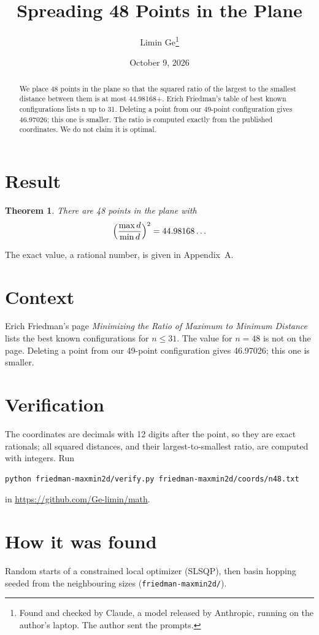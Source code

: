 \documentclass[11pt,a4paper]{article}
\title{Spreading 48 Points in the Plane}
\author{Limin Ge\thanks{Found and checked by Claude, a model released by Anthropic, running on the author's laptop. The author sent the prompts.}}
\date{October 9, 2026}
\newtheorem*{theorem}{Theorem}
\begin{document}
\maketitle
\begin{abstract}
We place 48 points in the plane so that the squared ratio of the largest to the smallest distance between them is at most 44.98168+. Erich Friedman's table of best known configurations lists n up to 31. Deleting a point from our 49-point configuration gives 46.97026; this one is smaller. The ratio is computed exactly from the published coordinates. We do not claim it is optimal.
\end{abstract}

\section{Result}
\begin{theorem}
There are 48 points in the plane with
\[ \Bigl(\frac{\max d}{\min d}\Bigr)^2 = 44.98168\ldots \]
\end{theorem}
The exact value, a rational number, is given in Appendix~A.


\section{Context}
Erich Friedman's page \emph{Minimizing the Ratio of Maximum to Minimum Distance} lists the best known configurations for $n\le 31$. The value for $n=48$ is not on the page. Deleting a point from our 49-point configuration gives 46.97026; this one is smaller.


\section{Verification}
The coordinates are decimals with 12 digits after the point, so they are exact rationals; all squared distances, and their largest-to-smallest ratio, are computed with integers. Run
\begin{verbatim}
python friedman-maxmin2d/verify.py friedman-maxmin2d/coords/n48.txt
\end{verbatim}
in \url{https://github.com/Ge-limin/math}.


\section{How it was found}
Random starts of a constrained local optimizer (SLSQP), then basin hopping seeded from the neighbouring sizes (\texttt{friedman-maxmin2d/}).
\end{document}
